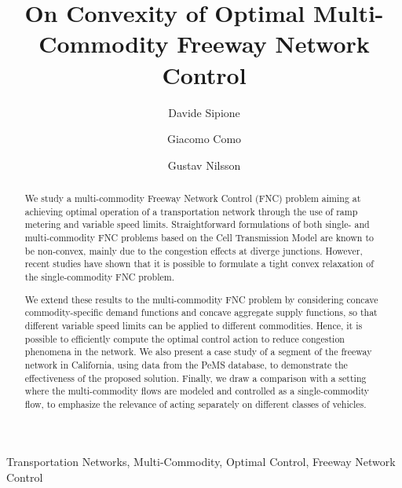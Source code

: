 \documentclass[preprint,12pt]{elsarticle}
\begin{document}
		\begin{frontmatter}
		
		\title{On Convexity of Optimal Multi-Commodity Freeway Network Control}
		
		\author[inst1]{Davide Sipione}
		
		\author[inst1]{Giacomo Como}
		
		\author[inst2]{Gustav Nilsson}
\address[inst1]{Department of Mathematical Sciences, Politecnico di Torino, Turin, Italy}
\address[inst2]{Univ. Grenoble Alpes, Inria, CNRS, Grenoble INP, GIPSA-Lab, 38000 Grenoble, France}


\begin{abstract}
	We study a multi-commodity Freeway Network Control (FNC) problem aiming at achieving optimal operation of a transportation network through the use of ramp metering and variable speed limits. Straightforward formulations of both single- and multi-commodity FNC problems based on the Cell Transmission Model are known to be non-convex, mainly due to the congestion effects at diverge junctions. However, recent studies have shown that it is possible to formulate a tight convex relaxation of the single-commodity FNC problem.
	
	We extend  these results to the multi-commodity FNC problem by considering concave commodity-specific demand functions and concave aggregate supply functions, so that different variable speed limits can be applied to different commodities. Hence, it is possible to efficiently compute the optimal control action to reduce congestion phenomena in the network. We also present a case study of a segment of the freeway network in California, using data from the PeMS database, to demonstrate the effectiveness of the proposed solution. Finally, we draw a comparison with a setting where the multi-commodity flows are modeled and controlled as a single-commodity flow, to emphasize the relevance of acting separately on different classes of vehicles.

\end{abstract}

\begin{keyword}
	Transportation Networks, Multi-Commodity, Optimal Control, Freeway Network Control
\end{keyword}




\end{frontmatter}
\end{document}
